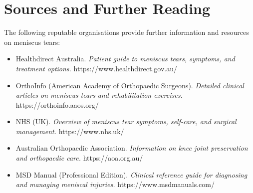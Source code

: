 \section*{Sources and Further Reading}
The following reputable organisations provide further information and resources on meniscus tears:
\begin{itemize}
    \item Healthdirect Australia. \textit{Patient guide to meniscus tears, symptoms, and treatment options.} https://www.healthdirect.gov.au/
    \item OrthoInfo (American Academy of Orthopaedic Surgeons). \textit{Detailed clinical articles on meniscus tears and rehabilitation exercises.} https://orthoinfo.aaos.org/
    \item NHS (UK). \textit{Overview of meniscus tear symptoms, self-care, and surgical management.} https://www.nhs.uk/
    \item Australian Orthopaedic Association. \textit{Information on knee joint preservation and orthopaedic care.} https://aoa.org.au/
    \item MSD Manual (Professional Edition). \textit{Clinical reference guide for diagnosing and managing meniscal injuries.} https://www.msdmanuals.com/
\end{itemize}
